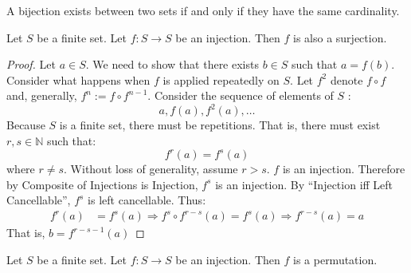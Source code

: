 \documentclass{article}
\begin{document}
\begin{lema}\label{cor:finite_biject}
{A bijection exists between two  sets if and only if they have the same cardinality.}
\end{lema}
\begin{lema}\label{lem:9oqjdad}
Let $S$ be a finite set.
Let $f: S \rightarrow S$ be an injection.
Then $f$ is also a surjection.
\end{lema}
\begin{proof}
Let $a \in S$.
We need to show that there exists $b \in S$ such that $a=f(b)$.
Consider what happens when $f$ is applied repeatedly on $S$.
Let $f^{2}$ denote $f \circ f$ and, generally, $f^{n}:=f \circ f^{n-1}$.
Consider the sequence of elements of $S$ :
$$
a, f(a), f^{2}(a), \ldots
$$
Because $S$ is a finite set, there must be repetitions.
That is, there must exist $r, s \in \mathbb{N}$ such that:
$$
f^{r}(a)=f^{s}(a)
$$
where $r \neq s$.
Without loss of generality, assume $r>s$.
$f$ is an injection.
Therefore by Composite of Injections is Injection, $f^{s}$ is an injection.
By ``Injection iff Left Cancellable'', $f^{s}$ is left cancellable.
Thus:
$$
\begin{aligned}
f^{r}(a) &=f^{s}(a) \Rightarrow f^{s} \circ f^{r-s}(a) =f^{s}(a) \Rightarrow f^{r-s}(a)=a 
\end{aligned}
$$
That is, $b=f^{r-s-1}(a)$
\end{proof}
\begin{cora}
Let $S$ be a finite set.
Let $f: S \rightarrow S$ be an injection.
Then $f$ is a permutation.
\end{cora}
\end{document}
